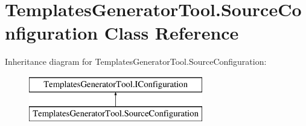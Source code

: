 \hypertarget{class_templates_generator_tool_1_1_source_configuration}{}\section{Templates\+Generator\+Tool.\+Source\+Configuration Class Reference}
\label{class_templates_generator_tool_1_1_source_configuration}
Inheritance diagram for Templates\+Generator\+Tool.\+Source\+Configuration\+:\begin{figure}[H]
\begin{center}
\leavevmode
\includegraphics[height=2.000000cm]{class_templates_generator_tool_1_1_source_configuration}
\end{center}
\end{figure}

